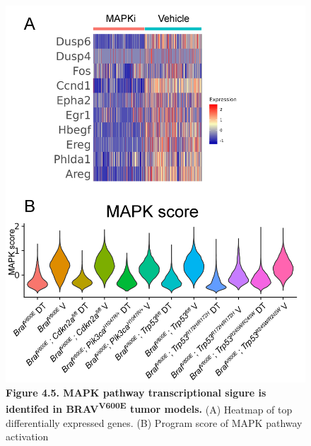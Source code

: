 \begin{figure}
\hypertarget{fig:04}{%
\centering
\includegraphics[width=1\textwidth,height=\textheight]{images/scrna_5.png}
\caption{\textbf{Figure 4.5. MAPK pathway transcriptional sigure is identifed in BRAV\textsuperscript{V600E} tumor models.} (A) Heatmap of top differentially expressed genes. (B) Program score of MAPK pathway activation}\label{fig:04}
}
\end{figure}

